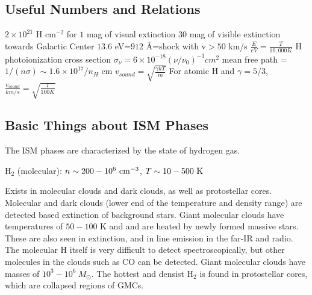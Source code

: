 \subsection{Useful Numbers and Relations}
$2\times10^{21}$ H cm$^{-2}$ for $1$ mag of visual extinction\newline
\newline
$30$ mag of visible extinction towards Galactic Center\newline
\newline
$13.6$ eV=$912$ \AA=shock with v$>50$ km/s\newline
\newline
$\frac{E}{eV}=\frac{T}{10,000 K}$\newline
\newline
H photoionization cross section $\sigma_{\nu}=6\times10^{-18}(\nu/\nu_0)^{-3}
cm^2$\newline
\newline
mean free path = $1/(n\sigma)\sim 1.6\times10^{17}/n_H$ cm\newline
\newline
$v_{sound}=\sqrt{\frac{\gamma kT}{m}}$\newline
\newline
For atomic H and $\gamma=5/3$,\newline
\newline
$\frac{v_{sound}}{km/s}=\sqrt{\frac{T}{100 K}}$

\subsection{Basic Things about ISM Phases}

The ISM phases are characterized by the state of hydrogen gas.

H$_2$ (molecular): $n \sim 200-10^6~{\rm cm}^{-3}$, $T \sim 10-500~{\rm K}$

Exists in molecular clouds and dark clouds, as well as protostellar cores.  
Molecular and dark clouds (lower end of the temperature and density range) are 
detected based extinction of background stars.  Giant molecular clouds 
have temperatures of $50-100$ K and and are heated by newly formed massive 
stars.  These are also seen in extinction, and in line emission in the far-IR 
and radio.  The molecular H itself is very difficult to detect 
spectroscopically, but other molecules in the clouds such as CO can be 
detected.  Giant molecular clouds have masses of 
$10^3-10^6\ M_{\odot}$.  The hottest and densist H$_2$ is found in protostellar 
cores, which are collapsed regions of GMCs.  

